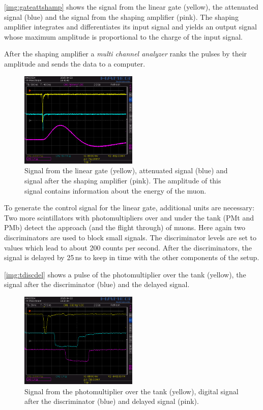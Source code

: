 \autoref{img:gateattshamp} shows the signal from the linear gate (yellow), the attenuated signal (blue) and
the signal from the shaping amplifier (pink).
The shaping amplifier integrates and differentiates its input signal and yields an output signal
whose maximum amplitude is proportional to the charge of the input signal.

After the shaping amplifier a \emph{multi channel analyzer} ranks the pulses by their amplitude
and sends the data to a computer.

\begin{figure}[H]
\begin{center}
  \includegraphics[width=0.5\textwidth]{../img/S0015.PNG}
  \caption{Signal from the linear gate (yellow), attenuated signal (blue) and signal after the shaping 
 amplifier (pink). The amplitude of this signal contains information about the energy of the muon.}
  \label{img:gateattshamp}
\end{center}
\end{figure}

To generate the control signal for the linear gate, additional units are necessary:
Two more scintillators with photomultipliers over and under the tank (PMt and PMb)
detect the approach (and the flight through) of muons.
Here again two discriminators are used to block small signals.
The discriminator levels are set to values which lead to about 200 counts per second.
After the discriminators, the signal is delayed by 25\,ns to keep in time with the other components
of the setup.

\autoref{img:tdiscdel} shows a pulse of 
the photomultiplier over the tank (yellow), the signal after the discriminator (blue) and
the delayed signal.

\begin{figure}[H]
\begin{center}
  \includegraphics[width=0.5\textwidth]{../img/S0006.PNG}
  \caption{Signal from the photomultiplier over the tank (yellow), digital signal after the discriminator (blue)
  and delayed signal (pink).}
  \label{img:tdiscdel}
\end{center}
\end{figure}

